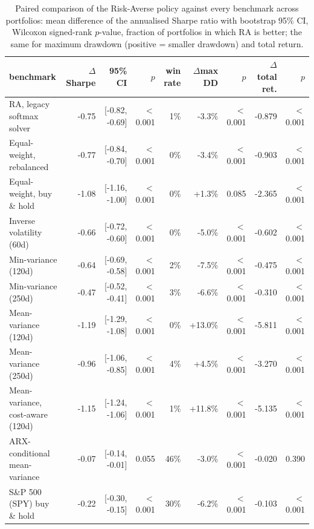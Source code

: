 \begin{table}[ht!]
\centering
\footnotesize
\setlength{\tabcolsep}{4pt}
\begin{tabular}{lrrrrrrrr}
\hline
benchmark & $\Delta$Sharpe & 95\% CI & $p$ & win rate & $\Delta$max DD & $p$ & $\Delta$total ret. & $p$ \\
\hline
RA, legacy softmax solver & -0.75 & [-0.82, -0.69] & $<$0.001 & 1\% & -3.3\% & $<$0.001 & -0.879 & $<$0.001 \\
Equal-weight, rebalanced & -0.77 & [-0.84, -0.70] & $<$0.001 & 0\% & -3.4\% & $<$0.001 & -0.903 & $<$0.001 \\
Equal-weight, buy \& hold & -1.08 & [-1.16, -1.00] & $<$0.001 & 0\% & +1.3\% & 0.085 & -2.365 & $<$0.001 \\
Inverse volatility (60d) & -0.66 & [-0.72, -0.60] & $<$0.001 & 0\% & -5.0\% & $<$0.001 & -0.602 & $<$0.001 \\
Min-variance (120d) & -0.64 & [-0.69, -0.58] & $<$0.001 & 2\% & -7.5\% & $<$0.001 & -0.475 & $<$0.001 \\
Min-variance (250d) & -0.47 & [-0.52, -0.41] & $<$0.001 & 3\% & -6.6\% & $<$0.001 & -0.310 & $<$0.001 \\
Mean-variance (120d) & -1.19 & [-1.29, -1.08] & $<$0.001 & 0\% & +13.0\% & $<$0.001 & -5.811 & $<$0.001 \\
Mean-variance (250d) & -0.96 & [-1.06, -0.85] & $<$0.001 & 4\% & +4.5\% & $<$0.001 & -3.270 & $<$0.001 \\
Mean-variance, cost-aware (120d) & -1.15 & [-1.24, -1.06] & $<$0.001 & 1\% & +11.8\% & $<$0.001 & -5.135 & $<$0.001 \\
ARX-conditional mean-variance & -0.07 & [-0.14, -0.01] & 0.055 & 46\% & -3.0\% & $<$0.001 & -0.020 & 0.390 \\
S\&P 500 (SPY) buy \& hold & -0.22 & [-0.30, -0.15] & $<$0.001 & 30\% & -6.2\% & $<$0.001 & -0.103 & $<$0.001 \\
\hline
\end{tabular}
\caption{Paired comparison of the Risk-Averse policy against every benchmark across portfolios: mean difference of the annualised Sharpe ratio with bootstrap 95\% CI, Wilcoxon signed-rank $p$-value, fraction of portfolios in which RA is better; the same for maximum drawdown (positive = smaller drawdown) and total return.}
\label{tab:bench_paired_covid}
\end{table}
